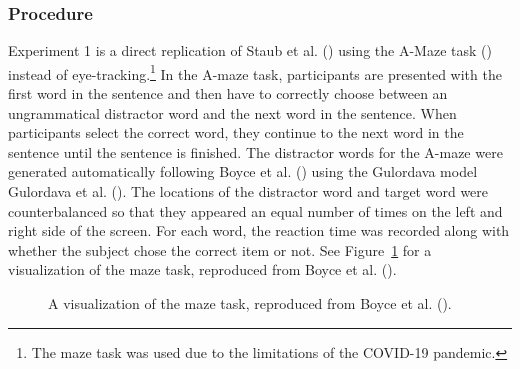 \documentclass[
  12pt,
  letterpaper,
]{scrreport}
\begin{document}
\subsubsection{Procedure}\label{procedure}

Experiment 1 is a direct replication of Staub et al.
() using the A-Maze
task () instead
of eye-tracking.\footnote{The maze task was used due to the limitations
  of the COVID-19 pandemic.} In the A-maze task, participants are
presented with the first word in the sentence and then have to correctly
choose between an ungrammatical distractor word and the next word in the
sentence. When participants select the correct word, they continue to
the next word in the sentence until the sentence is finished. The
distractor words for the A-maze were generated automatically following
Boyce et al. () using the
Gulordava model Gulordava et al.
(). The
locations of the distractor word and target word were counterbalanced so
that they appeared an equal number of times on the left and right side
of the screen. For each word, the reaction time was recorded along with
whether the subject chose the correct item or not. See
Figure~\ref{fig-mazevisualization} for a visualization of the maze task,
reproduced from Boyce et al.
().

\begin{figure}[htbp]

\caption{\label{fig-mazevisualization}A visualization of the maze task,
reproduced from Boyce et al.
().}


\end{figure}%
\end{document}
